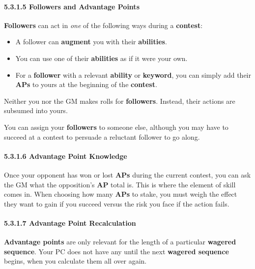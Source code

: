 \documentclass[
  11pt,
]{article}
\providecommand{\tightlist}{%
  \setlength{\itemsep}{0pt}\setlength{\parskip}{0pt}}
\begin{document}
\hypertarget{followers-and-advantage-points}{%
\paragraph{5.3.1.5 Followers and Advantage
Points}\label{followers-and-advantage-points}}

\textbf{Followers} can act in \emph{one} of the following ways during a
\textbf{contest}:

\begin{itemize}
\tightlist
\item
  A follower can \textbf{augment} you with their \textbf{abilities}.
\item
  You can use one of their \textbf{abilities} as if it were your own.
\item
  For a \textbf{follower} with a relevant \textbf{ability} or
  \textbf{keyword}, you can simply add their \textbf{APs} to yours at
  the beginning of the \textbf{contest}.
\end{itemize}

Neither you nor the GM makes rolls for \textbf{followers}. Instead,
their actions are subsumed into yours.

You can assign your \textbf{followers} to someone else, although you may
have to succeed at a contest to persuade a reluctant follower to go
along.

\hypertarget{advantage-point-knowledge}{%
\paragraph{5.3.1.6 Advantage Point
Knowledge}\label{advantage-point-knowledge}}

Once your opponent has won or lost \textbf{APs} during the current
contest, you can ask the GM what the opposition's \textbf{AP} total is.
This is where the element of skill comes in. When choosing how many
\textbf{APs} to stake, you must weigh the effect they want to gain if
you succeed versus the risk you face if the action fails.

\hypertarget{advantage-point-recalculation}{%
\paragraph{5.3.1.7 Advantage Point
Recalculation}\label{advantage-point-recalculation}}

\textbf{Advantage points} are only relevant for the length of a
particular \textbf{wagered sequence}. Your PC does not have any until
the next \textbf{wagered sequence} begins, when you calculate them all
over again.
\end{document}
